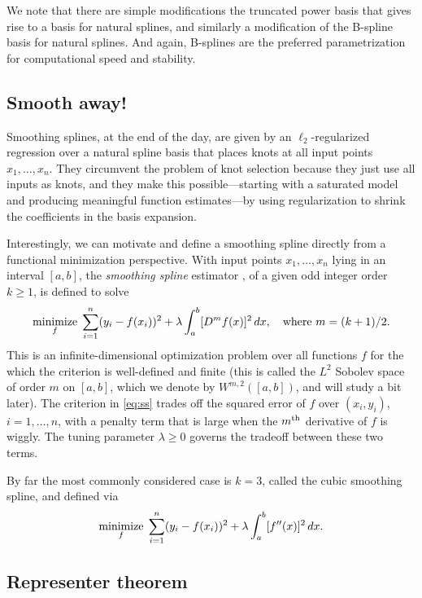\documentclass{article}
\begin{document}
We note that there are simple modifications the truncated power basis that gives
rise to a basis for natural splines, and similarly a modification of the
B-spline basis for natural splines. And again, B-splines are the preferred
parametrization for computational speed and stability. 

\subsection{Smooth away!}

Smoothing splines, at the end of the day, are given by an $\ell_2$-regularized
regression over a natural spline basis that places knots at all input points 
$x_1,\dots,x_n$. They circumvent the problem of knot selection because they
just use all inputs as knots, and they make this possible---starting with a 
saturated model and producing meaningful function estimates---by using
regularization to shrink the coefficients in the basis expansion.

Interestingly, we can motivate and define a smoothing spline directly from a
functional minimization perspective. With input points $x_1,\dots,x_n$ lying in 
an interval $[a,b]$, the \emph{smoothing spline} estimator \smash{$\hf$}, of a
given odd integer order $k \geq 1$, is defined to solve   
\begin{equation}
\label{eq:ss}
\mathop{\mathrm{minimize}}_f \; \sum_{i=1}^n (y_i - f(x_i))^2 + \lambda \int_a^b [D^m f(x)]^2 \,
dx, \quad \text{where $m=(k+1)/2$}.
\end{equation}
This is an infinite-dimensional optimization problem over all functions $f$ for
the which the criterion is well-defined and finite (this is called the $L^2$
Sobolev space of order $m$ on $[a,b]$, which we denote by $W^{m,2}([a,b])$, and
will study a bit later). The criterion in \eqref{eq:ss} trades off the squared
error of $f$ over $(x_i,y_i)$, $i=1,\dots,n$, with a penalty term that is large
when the $m^{\text{th}}$ derivative of $f$ is wiggly. The tuning parameter $\lambda \geq 
0$ governs the tradeoff between these two terms. 

By far the most commonly considered case is $k=3$, called the cubic smoothing
spline, and defined via
\begin{equation}
\label{eq:ss_cubic}
\mathop{\mathrm{minimize}}_f \; \sum_{i=1}^n (y_i - f(x_i))^2 + \lambda \int_a^b [f''(x)]^2 \, dx.
\end{equation}

\subsection{Representer theorem}
\end{document}
